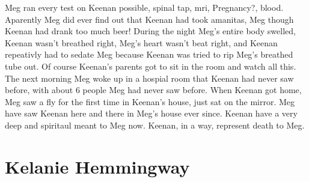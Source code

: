 \documentclass[12pt]{book}
\begin{document}
Meg ran every test on Keenan possible, spinal tap, mri, Pregnancy?, blood. Aparently Meg did ever find out that Keenan had took amanitas, Meg though Keenan had drank too much beer! During the night Meg's entire body swelled, Keenan wasn't breathed right, Meg's heart wasn't beat right, and Keenan repeativly had to sedate Meg because Keenan was tried to rip Meg's breathed tube out. Of course Keenan's parents got to sit in the room and watch all this. The next morning Meg woke up in a hospial room that Keenan had never saw before, with about 6 people Meg had never saw before. When Keenan got home, Meg saw a fly for the first time in Keenan's house, just sat on the mirror. Meg have saw Keenan here and there in Meg's house ever since. Keenan have a very deep and spiritaul meant to Meg now. Keenan, in a way, represent death to Meg.



\chapter{Kelanie Hemmingway}
\end{document}
